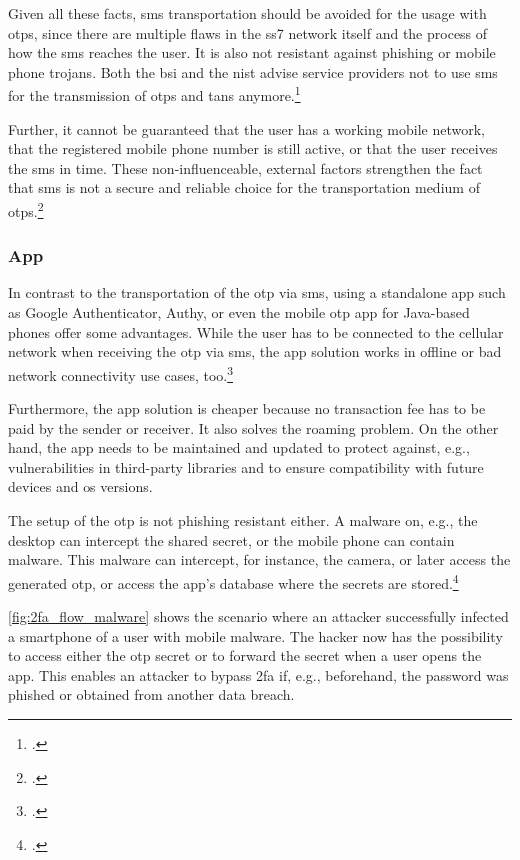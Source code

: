 Given all these facts, \gls{sms} transportation should be avoided for the usage with \glspl{otp}, since there are multiple flaws in the \gls{ss7} network itself and the process of how the \gls{sms} reaches the user. It is also not resistant against phishing or mobile phone trojans. Both the \gls{bsi} and the \gls{nist} advise service providers not to use \gls{sms} for the transmission of \glspl{otp} and \glspl{tan} anymore.\footcites[See][8]{JAKOBSSON20186}[See][27]{bsi2019recommendations2}[See][19]{SP80063B}[See][407]{10.1007/978-3-662-54970-4_24}

Further, it cannot be guaranteed that the user has a working mobile network, that the registered mobile phone number is still active, or that the user receives the \gls{sms} in time. These non-influenceable, external factors strengthen the fact that \gls{sms} is not a secure and reliable choice for the transportation medium of \glspl{otp}.\footcites[See][327]{5945255}

\subsubsection{App}
\label{sec:app}
 
 In contrast to the transportation of the \gls{otp} via \gls{sms}, using a standalone app such as Google Authenticator, Authy, or even the mobile \gls{otp} app for Java-based phones offer some advantages. While the user has to be connected to the cellular network when receiving the \gls{otp} via \gls{sms}, the app solution works in offline or bad network connectivity use cases, too.\footcites[See][228]{6920371}
 
 Furthermore, the app solution is cheaper because no transaction fee has to be paid by the sender or receiver. It also solves the roaming problem. On the other hand, the app needs to be maintained and updated to protect against, e.g., vulnerabilities in third-party libraries and to ensure compatibility with future devices and \gls{os} versions.
 
 The setup of the \gls{otp} is not phishing resistant either. A malware on, e.g., the desktop can intercept the shared secret, or the mobile phone can contain malware. This malware can intercept, for instance, the camera, or later access the generated \gls{otp}, or access the app's database where the secrets are stored.\footcites[See][371]{10.1007/978-3-662-45472-5_24}[See][407]{10.1007/978-3-662-54970-4_24}
 
 \autoref{fig:2fa_flow_malware} shows the scenario where an attacker successfully infected a smartphone of a user with mobile malware. The hacker now has the possibility to access either the \gls{otp} secret or to forward the secret when a user opens the app. This enables an attacker to bypass \gls{2fa} if, e.g., beforehand, the password was phished or obtained from another data breach.

